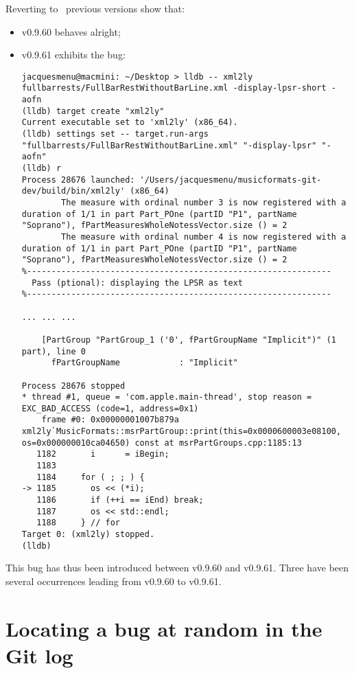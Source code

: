 Reverting to \mf\ previous versions show that:
\begin{itemize}
\item v0.9.60 behaves alright;
\item v0.9.61 exhibits the bug:

\begin{lstlisting}[language=Terminal]
jacquesmenu@macmini: ~/Desktop > lldb -- xml2ly  fullbarrests/FullBarRestWithoutBarLine.xml -display-lpsr-short -aofn
(lldb) target create "xml2ly"
Current executable set to 'xml2ly' (x86_64).
(lldb) settings set -- target.run-args  "fullbarrests/FullBarRestWithoutBarLine.xml" "-display-lpsr" "-aofn"
(lldb) r
Process 28676 launched: '/Users/jacquesmenu/musicformats-git-dev/build/bin/xml2ly' (x86_64)
        The measure with ordinal number 3 is now registered with a duration of 1/1 in part Part_POne (partID "P1", partName "Soprano"), fPartMeasuresWholeNotessVector.size () = 2
        The measure with ordinal number 4 is now registered with a duration of 1/1 in part Part_POne (partID "P1", partName "Soprano"), fPartMeasuresWholeNotessVector.size () = 2
%--------------------------------------------------------------
  Pass (ptional): displaying the LPSR as text
%--------------------------------------------------------------

... ... ...

    [PartGroup "PartGroup_1 ('0', fPartGroupName "Implicit")" (1 part), line 0
      fPartGroupName            : "Implicit"

Process 28676 stopped
* thread #1, queue = 'com.apple.main-thread', stop reason = EXC_BAD_ACCESS (code=1, address=0x1)
    frame #0: 0x00000001007b879a xml2ly`MusicFormats::msrPartGroup::print(this=0x0000600003e08100, os=0x000000010ca04650) const at msrPartGroups.cpp:1185:13
   1182	      i      = iBegin;
   1183
   1184	    for ( ; ; ) {
-> 1185	      os << (*i);
   1186	      if (++i == iEnd) break;
   1187	      os << std::endl;
   1188	    } // for
Target 0: (xml2ly) stopped.
(lldb)
\end{lstlisting}

\end{itemize}

This bug has thus been introduced between v0.9.60 and v0.9.61.
Three have been several  occurrences leading from v0.9.60 to v0.9.61.


\section{Locating a bug at random in the Git log}

